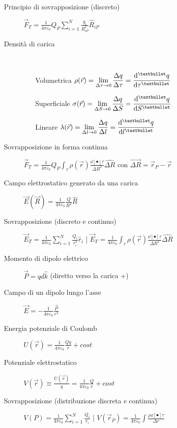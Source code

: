 \documentclass[10pt, oneside]{article}
\newcommand{\limit}[2]{\lim\limits_{#1 \rightarrow #2}}
\begin{document}
\begin{description}
\item[Principio di sovrapposizione (discreto)] \hfill $\displaystyle \vec{F}_T = \frac{1}{4 \pi \varepsilon_0} Q_P \sum\limits_{i=1}^{N} \frac{q_i}{R_{iP}^2}\hat{R}_{iP}$

\item[Densità di carica] \,
\begin{itemize}
\item[Volumetrica] \hfill $\displaystyle \rho(\vec{r}) = \limit{\Delta \tau}{0} \frac{\Delta q}{\Delta \tau} = \dv[•]{q}{\tau}$
\item[Superficiale] \hfill $\displaystyle \sigma(\vec{r}) = \limit{\Delta S}{0} \frac{\Delta q}{\Delta S} = \dv[•]{q}{S}$
\item[Lineare] \hfill $\displaystyle \lambda(\vec{r}) = \limit{\Delta l}{0} \frac{\Delta q}{\Delta l} = \dv[•]{q}{l}$
\end{itemize}

\item[Sovrapposizione in forma continua] \hfill $\displaystyle \vec{F}_T = \frac{1}{4 \pi \varepsilon_0} Q_P \int_\tau \rho(\vec{r}) \frac{\dd[•]{\tau}}{\Delta R^2} \hat{\Delta R}$ \quad
con $\vec{\Delta R} = \vec{r}_P - \vec{r}$

\item[Campo elettrostatico generato da una carica] \hfill $\vec{E}(\vec{R}) = \frac{1}{4 \pi \varepsilon_0} \frac{Q}{R^2} \hat{R}$

\item[Sovrapposizione (discreto e continuo)] \hfill $\displaystyle \vec{E}_T = \frac{1}{4 \pi \varepsilon_0} \sum\limits_{i=1}^{N} \frac{Q_i}{r_i^2}\hat{r}_i$ \quad | \quad $\vec{E}_T = \frac{1}{4 \pi \varepsilon_0} \int_\tau \rho(\vec{r}) \frac{\dd[•]{\tau}}{\Delta R^2} \hat{\Delta R}$

\item[Momento di dipolo elettrico] \hfill $\displaystyle \vec{P} = q d \hat{k}$ (diretto verso la carica +)

\item[Campo di un dipolo lungo l'asse] \hfill $\displaystyle \vec{E} = - \frac{1}{4 \pi \varepsilon_0} \frac{\vec{P}}{r^3}$

\item[Energia potenziale di Coulomb] \hfill $\displaystyle U(\vec{r}) = \frac{1}{4 \pi \varepsilon_0} \frac{Q q}{r} + cost$

\item[Potenziale elettrostatico] \hfill $\displaystyle V(\vec{r}) \equiv \frac{U(\vec{r})}{q} = \frac{1}{4 \pi \varepsilon_0} \frac{Q}{r} + cost$

\item[Sovrapposizione (distribuzione discreta e continua)] \hfill $\displaystyle V(P) = \frac{1}{4 \pi \varepsilon_0} \sum\limits_{i=1}^{N} \frac{Q_i}{r_i}$ \quad | \quad $\displaystyle V(\vec{r}_P) = \frac{1}{4 \pi \varepsilon_0} \int \frac{\rho \dd[•]{\tau}}{\Delta r}$

\end{description}
\end{document}
